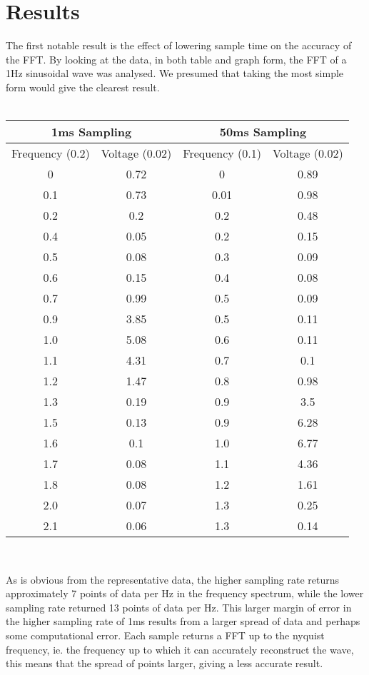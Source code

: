 \documentclass{article}
\begin{document}
\section{Results}
The first notable result is the effect of lowering sample time on the accuracy of the FFT. By looking at the data, in both table and graph form, the FFT of a 1Hz sinusoidal wave was analysed. We presumed that taking the most simple form would give the clearest result.\\
\vspace{3mm}\\
\begin{center}
\begin{tabular}{|c|c|c|c|}
 \hline 
 \multicolumn{2}{|c|}{1ms Sampling} & \multicolumn{2}{|c|}{50ms Sampling} \\ 
 \hline 
 Frequency (0.2) & Voltage (0.02) & Frequency (0.1) & Voltage (0.02)\\ 
 \hline 
 0 & 0.72 & 0 & 0.89 \\ 
 \hline 
 0.1 & 0.73 & 0.01 & 0.98 \\ 
 \hline 
 0.2 & 0.2 & 0.2 & 0.48 \\ 
 \hline 
 0.4 & 0.05 & 0.2 & 0.15 \\ 
 \hline 
 0.5 & 0.08 & 0.3 & 0.09 \\ 
 \hline 
 0.6 & 0.15 & 0.4 & 0.08 \\ 
 \hline 
 0.7 & 0.99 & 0.5 &  0.09\\ 
 \hline 
 0.9 & 3.85 & 0.5 & 0.11 \\ 
 \hline 
 1.0 & 5.08 & 0.6 & 0.11 \\ 
 \hline 
 1.1 & 4.31 & 0.7 & 0.1 \\ 
 \hline 
 1.2 & 1.47 & 0.8 & 0.98 \\ 
 \hline 
 1.3 & 0.19 & 0.9 & 3.5 \\ 
 \hline 
 1.5 & 0.13 & 0.9 & 6.28 \\ 
 \hline 
 1.6 & 0.1 & 1.0 & 6.77 \\ 
 \hline 
 1.7 & 0.08 & 1.1 & 4.36 \\ 
 \hline 
 1.8 & 0.08 & 1.2 & 1.61 \\ 
 \hline 
 2.0 & 0.07 & 1.3 & 0.25 \\ 
 \hline 
 2.1 & 0.06 & 1.3 & 0.14 \\ 
 \hline 
\end{tabular}  \\
\end{center}
\vspace{3mm}
As is obvious from the representative data, the higher sampling rate returns approximately 7 points of data per Hz in the frequency spectrum, while the lower sampling rate returned 13 points of data per Hz. This larger margin of error in the higher sampling rate of 1ms results from a larger spread of data and perhaps some computational error. Each sample returns a FFT up to the nyquist frequency, ie. the frequency up to which it can accurately reconstruct the wave, this means that the spread of points larger, giving a less accurate result.\\
\end{document}
